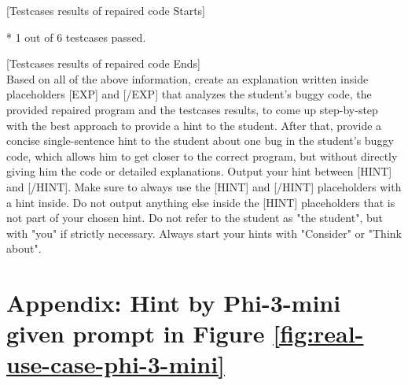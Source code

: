\documentclass{article}
\begin{document}
\begin{figure*}[h!]
\begin{tcolorbox}[colframe=black!10!white, colback=black!5!white]
\begin{minipage}{\textwidth}
            [Testcases results of repaired code Starts]

            * 1 out of 6 testcases passed.

            [Testcases results of repaired code Ends]\\
            
            Based on all of the above information, create an explanation written inside placeholders [EXP] and [/EXP] that analyzes the student's buggy code, the provided repaired program and the testcases results, to come up step-by-step with the best approach to provide a hint to the student. After that, provide a concise single-sentence hint to the student about one bug in the student's buggy code, which allows him to get closer to the correct program, but without directly giving him the code or detailed explanations. Output your hint between [HINT] and [/HINT]. Make sure to always use the [HINT] and [/HINT] placeholders with a hint inside. Do not output anything else inside the [HINT] placeholders that is not part of your chosen hint. Do not refer to the student as "the student", but with "you" if strictly necessary. Always start your hints with "Consider" or "Think about".
        \end{minipage}
    \end{tcolorbox}
    \caption{An example of the advanced prompt being used to query Phi-3-mini. Notice that the repaired program created by Phi-3-mini passes 1 out of 6 test cases, thus it's not a completely correct repaired program. \emph{Prompt was shortened for brevity.}}
    \label{fig:real-use-case-phi-3-mini}
\end{figure*}

\clearpage 

\section{Appendix: Hint by Phi-3-mini given prompt in Figure \ref{fig:real-use-case-phi-3-mini}}\label{appendix:real-use-case-phi-3-mini-response}
\end{document}
